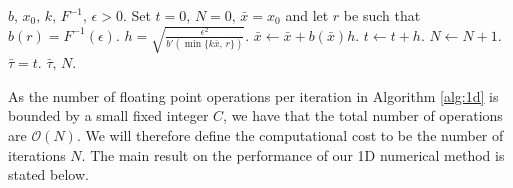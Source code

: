 \documentclass[a4paper, oneside, reqno]{amsart}
\theoremstyle{remark}
\begin{document}
\begin{algorithm}
    \caption{Estimating blow-up time of 1D ODE}
    \label{alg:1d}
    \begin{algorithmic}[1]
        \Require \(b,\, x_0,\, k,\, F^{-1},\,\epsilon > 0\).
        \State Set \(t = 0,\, N=0,\,\bar x = x_0\) and let \(r\) be such that \(b(r) = F^{-1}(\epsilon)\).
            \State \(h = \sqrt{\frac{\epsilon^2}{b'(\min\{k\bar x,\,r\})}}\).
            \State \(\bar x \leftarrow \bar x + b(\bar x)h\).
            \State \(t \leftarrow t + h\).
            \State \(N \leftarrow N+1\).
        \EndWhile
        \State \(\bar\tau = t\).
        \Ensure \(\bar\tau,\,N\).
    \end{algorithmic}
\end{algorithm}
As the number of floating point operations per iteration in Algorithm \ref{alg:1d} is bounded by a small fixed integer \(C\), we have that the total number of operations are \(\mathcal{O}(N)\). We will therefore define the computational cost to be the number of iterations \(N\).
The main result on the performance of our 1D numerical method is stated below. 
\end{document}

